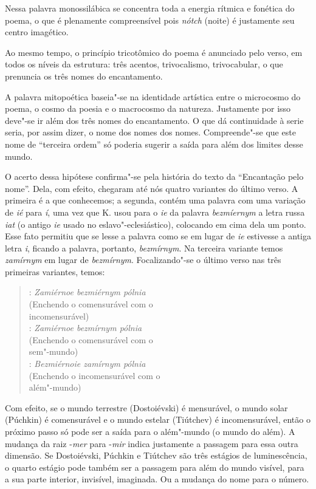 Nessa palavra monossilábica se concentra toda a energia rítmica e
fonética do poema, o que é plenamente compreensível pois \emph{nótch}
(noite) é justamente seu centro imagético.

Ao mesmo tempo, o princípio tricotômico do poema é anunciado pelo 
verso, em todos os níveis da estrutura: três acentos, trivocalismo,
trivocabular, o que prenuncia os três nomes do encantamento.

A palavra mitopoética baseia"-se na identidade artística entre o
microcosmo do poema, o cosmo da poesia e o macrocosmo da natureza.
Justamente por isso deve"-se ir além dos três nomes do encantamento. O
que dá continuidade à serie seria, por assim dizer, o nome dos nomes dos
nomes. Compreende"-se que este nome de ``terceira ordem'' só poderia
sugerir a saída para além dos limites desse mundo.

O acerto dessa hipótese confirma"-se pela história do texto da
``Encantação pelo nome''. Dela, com efeito, chegaram até nós quatro
variantes do último verso. A primeira é a que conhecemos; a segunda,
contém uma palavra com uma variação de \emph{ié} para \emph{í}, uma vez
que K. usou para o \emph{ie} da palavra \emph{bezm\emph{íe}rnym} a letra
russa \emph{iat} (o antigo \emph{ie} usado no eslavo"-eclesiástico),
colocando em cima dela um ponto. Esse fato permitiu que se lesse a
palavra como se em lugar de \emph{ie} estivesse a antiga letra
\emph{i}, ficando a palavra, portanto, \emph{bezmírnym}. Na terceira
variante temos \emph{zamírnym} em lugar de \emph{bezmírnym}.
Focalizando"-se o último verso nas três primeiras variantes, temos:

\begin{verse}
: \emph{Zamiérnoe bezmiérnym pólnia} \\
(Enchendo o comensurável com o \\
incomensurável) \\[8pt]

: \emph{Zamiérnoe bezmírnym pólnia} \\
(Enchendo o comensurável com o \\
sem"-mundo) \\[8pt]

: \emph{Bezmiérnoie zamírnym pólnia} \\
(Enchendo o incomensurável com o \\
além"-mundo)
\end{verse}

Com efeito, se o mundo terrestre (Dostoiévski) é mensurável, o mundo
solar (Púchkin) é comensurável e o mundo estelar (Tiútchev) é
incomensurável, então o próximo passo só pode ser a saída para o
além"-mundo (o mundo do além). A mudança da raiz -\emph{mer} para
-\emph{mir} indica justamente a passagem para essa outra dimensão. Se
Dostoiévski, Púchkin e Tiútchev são três estágios de luminescência, o
quarto estágio pode também ser a passagem para além do mundo visível,
para a sua parte interior, invisível, imaginada. Ou a mudança do nome
para o número.

